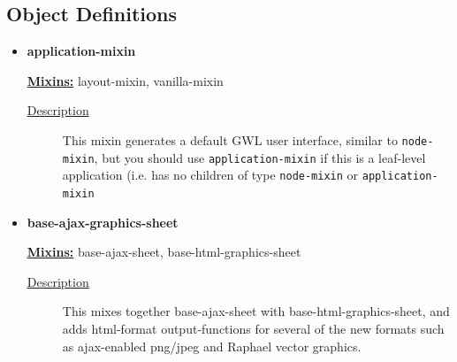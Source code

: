 \documentclass [11pt]{book}
\begin{document}
\subsection{Object Definitions}

\label{subsec:objectdefinitions}



\begin{itemize}

\item {}
\label{prim:application-mixin}
\textbf{application-mixin}


\textbf{
\underline{Mixins:}} layout-mixin, vanilla-mixin





\begin{description}

\item [
\underline{Description}]


This mixin generates a default GWL user interface, similar to \texttt{node-mixin}, but you should use
\texttt{application-mixin} if this is a leaf-level application (i.e. has no children of type \texttt{node-mixin}
or \texttt{application-mixin}



\end{description}









\item {}
\label{prim:base-ajax-graphics-sheet}
\textbf{base-ajax-graphics-sheet}


\textbf{
\underline{Mixins:}} base-ajax-sheet, base-html-graphics-sheet





\begin{description}

\item [
\underline{Description}]


This mixes together base-ajax-sheet 
with base-html-graphics-sheet, and adds html-format output-functions 
for several of the new formats such as ajax-enabled png/jpeg and 
Raphael vector graphics.



\end{description}









\end{itemize}
\end{document}
